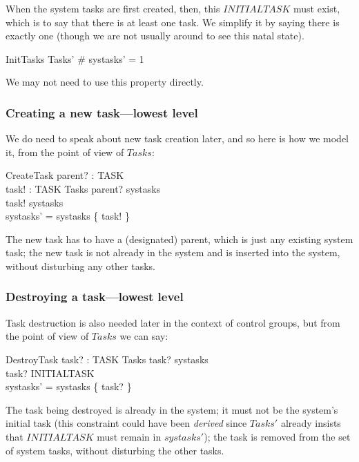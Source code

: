 \documentclass[a4paper,twoside,12pt]{article}
\begin{document}
When the system tasks are first created, then, this $INITIALTASK$ must exist, which is to say that there is at least one task. We simplify it by saying there is exactly one (though we are not usually around to see this natal state).

\begin{schema}{InitTasks}
Tasks'
\where
\# systasks' = 1
\end{schema}
We may not need to use this property directly.

\subsubsection{Creating a new task---lowest level}

We do need to speak about new task creation later, and so here is how we model it, from the point of view of $Tasks$:

\begin{schema}{CreateTask}
parent? : TASK \\
task! : TASK
\also
\Delta Tasks
\where
parent? \in systasks \\
task! \notin systasks \\
systasks' = systasks \cup \{ task! \}
\end{schema}
The new task has to have a (designated) parent, which is just any existing system task; the new task is not already
in the system and is inserted into the system, without disturbing any other tasks.

\subsubsection{Destroying a task---lowest level}

Task destruction is also needed later in the context of control groups, but from the point of view of $Tasks$ we can say:

\begin{schema}{DestroyTask}
task? : TASK
\also
\Delta Tasks
\where
task? \in systasks \\
task? \neq INITIALTASK \\
systasks'  = systasks \setminus \{ task? \}
\end{schema}
The task being destroyed is already in the system; it must not be the system's initial task
(this constraint could have been \emph{derived} since $Tasks'$ already insists that $INITIALTASK$
must remain in $systasks'$);
the task is removed from the set of system tasks, without disturbing the other tasks.
\end{document}
